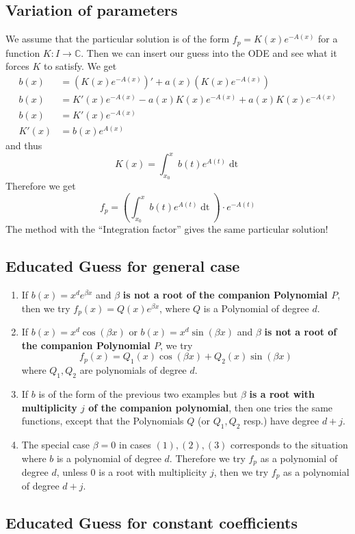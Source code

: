 \documentclass[a4paper,fontsize = 8pt]{scrartcl}
\def\C{\mathbb{C}}
\begin{document}
\subsection{Variation of parameters}
We assume that the particular solution is of the form \(f_p = K(x)e^{-A(x)}\) for a function \(K: I \to \C\). Then we can insert our guess into the ODE and see what it forces $K$ to satisfy. We get 
    \begin{align*}
        b(x) &= (K(x)e^{-A(x)})' + a(x)(K(x)e^{-A(x)})  \\
        b (x) &= K'(x)e^{-A(x)} - a(x)K(x)e^{-A(x)} + a(x)K(x)e^{-A(x)} \\
        b(x)  &= K'(x)e^{-A(x)} \\
        K'(x) &= b(x)e^{A(x)}
    \end{align*}
    and thus \[K(x) = \int_{x_0}^x b(t) e^{A(t)} \mathop{dt}\] Therefore we get \[f_p = \left(\int_{x_0}^x b(t) e^{A(t)} \mathop{dt}\right) \cdot e^{-A(t)}\]
    The method with the ``Integration factor'' gives the same particular solution!
\subsection{Educated Guess for general case}
\begin{enumerate}[label = (\arabic*)]
    \item If $b(x) = x^de^{\beta x}$ and $\beta$ \textbf{is not a root of the companion Polynomial $P$}, then we try $f_p(x) = Q(x)e^{\beta x}$, where $Q$ is a Polynomial of degree $d$.
    \item If $b(x) = x^d\cos(\beta x)$ or $b(x) = x^d\sin(\beta x)$ and $\beta$ \textbf{is not a root of the companion Polynomial $P$}, we try \[f_p(x) = Q_1(x)\cos(\beta x) + Q_2(x)\sin(\beta x)\] where $Q_1, Q_2$ are polynomials of degree $d$.
    \item If $b$ is of the form of the previous two examples but $\beta$ \textbf{is a root with multiplicity $j$ of the companion polynomial}, then one tries the same functions, except that the Polynomials $Q$ (or $Q_1, Q_2$ resp.) have degree $d+j$.
    \item The special case $\beta = 0$ in cases $(1), (2), (3)$ corresponds to the situation where $b$ is a polynomial of degree $d$. Therefore we try $f_p$ as a polynomial of degree $d$, unless $0$ is a root with multiplicity $j$, then we try $f_p$ as a polynomial of degree $d+j$.
\end{enumerate}


\subsection{Educated Guess for constant coefficients}
\end{document}
